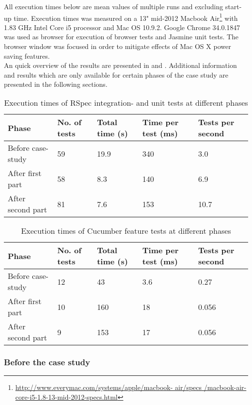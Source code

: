 
All execution times below are mean values of multiple runs and excluding
start-up time. Execution times was measured on a 13" mid-2012 Macbook
Air\footnote{\url{http://www.everymac.com/systems/apple/macbook-
air/specs /macbook-air-core-i5-1.8-13-mid-2012-specs.html}} with 1.83
GHz Intel Core i5 processor and Mac OS 10.9.2. Google Chrome 34.0.1847
was used as browser for execution of browser tests and Jasmine unit
tests. The browser window was focused in order to mitigate effects of
Mac OS X power saving features.\\

An quick overview of the results are presented in 
and . Additional information and results which
are only available for certain phases of the case study are presented in
the following sections.\\

\begin{table}[t]
    \centering
    \begin{tabular}{l l l l l}
        Phase & No. of tests & Total time (s) & Time per test (ms) & Tests per second\\
        \hline
        Before case-study & 59 & 19.9& 340 & 3.0 \\
        After first part  & 58 & 8.3 & 140 & 6.9 \\
        After second part & 81 & 7.6  & 153 & 10.7\\
    \end{tabular}
    \caption{ Execution times of RSpec integration- and unit tests at different phases }
    \label{tab:unit_times}
\end{table}


\begin{table}[t]
    \centering
    \begin{tabular}{l l l l l}
        Phase & No. of tests & Total time (s) & Time per test (ms) & Tests per second \\
        \hline
        Before case-study & 12 & 43 & 3.6 & 0.27 \\
        After first part  & 10 & 160 & 18 & 0.056\\
        After second part & 9 &  153 & 17 & 0.056\\
    \end{tabular}
    \caption{ Execution times of Cucumber feature tests at different phases }
    \label{tab:cucumber_times}
\end{table}


\subsubsection{Before the case study}

